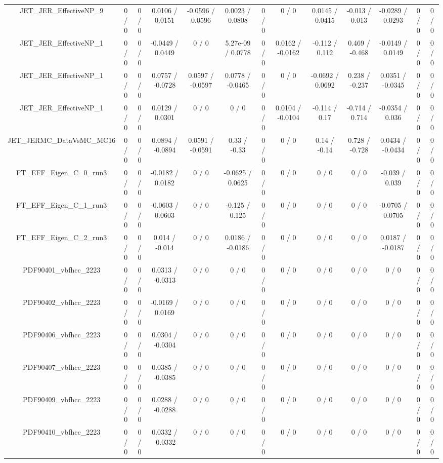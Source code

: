 \documentclass[10pt]{article}
\begin{document}
\begin{table}[htbp]
\begin{center}
\begin{tabular}{|c|c|c|c|c|c|c|c|c|c|c|c|c|}
  JET_JER_EffectiveNP_9 & 0 / 0 & 0 / 0 & 0.0106 / 0.0151 & -0.0596 / 0.0596 & 0.0023 / 0.0808 & 0 / 0 & 0 / 0 & 0.0145 / 0.0415 & -0.013 / 0.013 & -0.0289 / 0.0293 & 0 / 0 & 0 / 0 \\ 
  JET_JER_EffectiveNP_1 & 0 / 0 & 0 / 0 & -0.0449 / 0.0449 & 0 / 0 & 5.27e-09 / 0.0778 & 0 / 0 & 0.0162 / -0.0162 & -0.112 / 0.112 & 0.469 / -0.468 & -0.0149 / 0.0149 & 0 / 0 & 0 / 0 \\ 
  JET_JER_EffectiveNP_1 & 0 / 0 & 0 / 0 & 0.0757 / -0.0728 & 0.0597 / -0.0597 & 0.0778 / -0.0465 & 0 / 0 & 0 / 0 & -0.0692 / 0.0692 & 0.238 / -0.237 & 0.0351 / -0.0345 & 0 / 0 & 0 / 0 \\ 
  JET_JER_EffectiveNP_1 & 0 / 0 & 0 / 0 & 0.0129 / 0.0301 & 0 / 0 & 0 / 0 & 0 / 0 & 0.0104 / -0.0104 & -0.114 / 0.17 & -0.714 / 0.714 & -0.0354 / 0.036 & 0 / 0 & 0 / 0 \\ 
  JET_JERMC_DataVsMC_MC16 & 0 / 0 & 0 / 0 & 0.0894 / -0.0894 & 0.0591 / -0.0591 & 0.33 / -0.33 & 0 / 0 & 0 / 0 & 0.14 / -0.14 & 0.728 / -0.728 & 0.0434 / -0.0434 & 0 / 0 & 0 / 0 \\ 
  FT_EFF_Eigen_C_0_run3 & 0 / 0 & 0 / 0 & -0.0182 / 0.0182 & 0 / 0 & -0.0625 / 0.0625 & 0 / 0 & 0 / 0 & 0 / 0 & 0 / 0 & -0.039 / 0.039 & 0 / 0 & 0 / 0 \\ 
  FT_EFF_Eigen_C_1_run3 & 0 / 0 & 0 / 0 & -0.0603 / 0.0603 & 0 / 0 & -0.125 / 0.125 & 0 / 0 & 0 / 0 & 0 / 0 & 0 / 0 & -0.0705 / 0.0705 & 0 / 0 & 0 / 0 \\ 
  FT_EFF_Eigen_C_2_run3 & 0 / 0 & 0 / 0 & 0.014 / -0.014 & 0 / 0 & 0.0186 / -0.0186 & 0 / 0 & 0 / 0 & 0 / 0 & 0 / 0 & 0.0187 / -0.0187 & 0 / 0 & 0 / 0 \\ 
  PDF90401_vbfhcc_2223 & 0 / 0 & 0 / 0 & 0.0313 / -0.0313 & 0 / 0 & 0 / 0 & 0 / 0 & 0 / 0 & 0 / 0 & 0 / 0 & 0 / 0 & 0 / 0 & 0 / 0 \\ 
  PDF90402_vbfhcc_2223 & 0 / 0 & 0 / 0 & -0.0169 / 0.0169 & 0 / 0 & 0 / 0 & 0 / 0 & 0 / 0 & 0 / 0 & 0 / 0 & 0 / 0 & 0 / 0 & 0 / 0 \\ 
  PDF90406_vbfhcc_2223 & 0 / 0 & 0 / 0 & 0.0304 / -0.0304 & 0 / 0 & 0 / 0 & 0 / 0 & 0 / 0 & 0 / 0 & 0 / 0 & 0 / 0 & 0 / 0 & 0 / 0 \\ 
  PDF90407_vbfhcc_2223 & 0 / 0 & 0 / 0 & 0.0385 / -0.0385 & 0 / 0 & 0 / 0 & 0 / 0 & 0 / 0 & 0 / 0 & 0 / 0 & 0 / 0 & 0 / 0 & 0 / 0 \\ 
  PDF90409_vbfhcc_2223 & 0 / 0 & 0 / 0 & 0.0288 / -0.0288 & 0 / 0 & 0 / 0 & 0 / 0 & 0 / 0 & 0 / 0 & 0 / 0 & 0 / 0 & 0 / 0 & 0 / 0 \\ 
  PDF90410_vbfhcc_2223 & 0 / 0 & 0 / 0 & 0.0332 / -0.0332 & 0 / 0 & 0 / 0 & 0 / 0 & 0 / 0 & 0 / 0 & 0 / 0 & 0 / 0 & 0 / 0 & 0 / 0 \\ 

\end{tabular}
\end{center}
\end{table}
\end{document}
